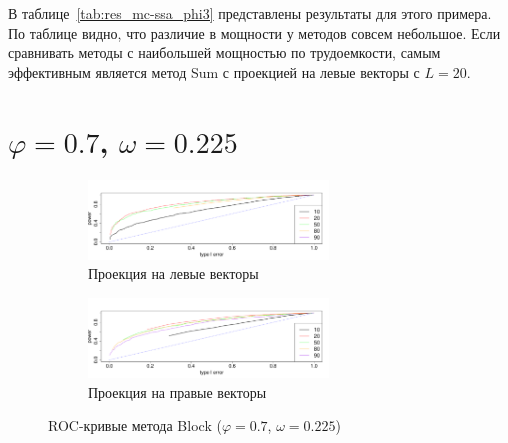 \documentclass[specialist,
substylefile = spbu_report.rtx,
subf,href,colorlinks=true, 12pt]{disser}
\theoremstyle{definition}
\begin{document}
В таблице~\ref{tab:res_mc-ssa_phi3} представлены результаты для этого примера. По таблице видно, что различие в мощности у методов совсем небольшое. Если сравнивать методы с наибольшей мощностью по трудоемкости, самым эффективным является метод Sum с проекцией на левые векторы с $L=20$.

\section{$\varphi=0.7$, $\omega=0.225$}
\begin{figure}
	\captionsetup[subfigure]{justification=Centering}
	\begin{subfigure}[t]{\textwidth}
		\centering
		\includegraphics[width=0.7\textwidth]{img/roc_block_ev_omega0225.pdf}
		\caption{Проекция на левые векторы}
	\end{subfigure}\hspace{\fill}
	\begin{subfigure}[t]{\textwidth}
		\centering
		\includegraphics[width=0.7\textwidth]{img/roc_block_fa_omega0225.pdf}
		\caption{Проекция на правые векторы}
	\end{subfigure}
	\caption{ROC-кривые метода Block ($\varphi=0.7$, $\omega=0.225$)}
	\label{fig:block_omega0225}
\end{figure}
\end{document}
